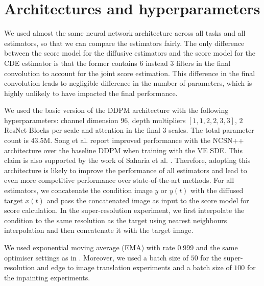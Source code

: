 \section{Architectures and hyperparameters}
\label{ch2:appendix:hyperparams}
We used almost the same neural network architecture across all tasks and all estimators, so that we can compare the estimators fairly. The only difference between the score model for the diffusive estimators and the score model for the CDE estimator is that the former contains $6$ instead $3$ filters in the final convolution to account for the joint score estimation. This difference in the final convolution leads to negligible difference in the number of parameters, which is highly unlikely to have impacted the final performance. 

We used the basic version of the DDPM architecture with the following hyperparameters: channel dimension $96$, depth multipliers $[1, 1, 2, 2, 3, 3]$, $2$ ResNet Blocks per scale and attention in the final $3$ scales. The total parameter count is 43.5M. Song et al. \cite{song2021sde} report improved performance with the NCSN++ architecture over the baseline DDPM when training with the VE SDE. This claim is also supported by the work of Saharia et al. \cite{saharia2021sr3}. Therefore, adopting this architecture is likely to improve the performance of all estimators and lead to even more competitive performance over state-of-the-art methods. For all estimators, we concatenate the condition image $y$ or $y(t)$ with the diffused target $x(t)$ and pass the concatenated image as input to the score model for score calculation. In the super-resolution experiment, we first interpolate the condition to the same resolution as the target using nearest neighbours interpolation and then concatenate it with the target image. 

We used exponential moving average (EMA) with rate 0.999 and the same optimiser settings as in \cite{song2021sde}. Moreover, we used a batch size of $50$ for the super-resolution and edge to image translation experiments and a batch size of $100$ for the inpainting experiments. 


